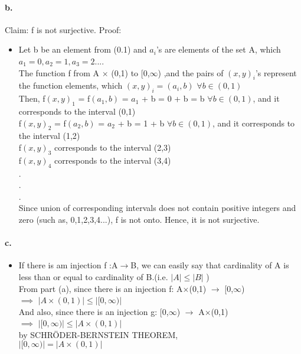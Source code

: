 \documentclass[11pt]{article}
\begin{document}
\paragraph{b.}
Claim: f is not surjective. \newline
Proof:
\begin{itemize}
    \item Let b be an element from (0.1) and $a_i$'s are elements of the set A, which $a_1 = 0, a_2 = 1, a_3 = 2 ...$.\\
    The function f from A $\times$ (0,1) to [0,$\infty$) ,and the pairs of $(x,y)_i$'s represent the function elements, which $(x,y)_i = (a_i,b)$ $ \forall b \in (0,1)$ \\
    Then, f$(x,y)_1$ = f$(a_1,b)$ = $a_1$ + b = 0 + b = b $\forall b \in (0,1)$, and it corresponds to the interval (0,1) \\
    f$(x,y)_2$ = f$(a_2,b)$ = $a_2$ + b = 1 + b $\forall b \in (0,1)$, and it corresponds to the interval (1,2) \\
    f$(x,y)_3$ corresponds to the interval (2,3) \\
    f$(x,y)_4$ corresponds to the interval (3,4) \\
    .\\
    .\\
    .\\
    Since union of corresponding intervals does not contain positive integers and zero (such as, 0,1,2,3,4...), f is not onto. Hence, it is not surjective.  
\end{itemize}
\paragraph{c.}
\begin{itemize}
    \item If there is am injection f :A$\rightarrow$B, we can easily say that cardinality of A is less than or equal to cardinality of B.(i.e. $|A| \leq |B|$ ) \\
    From part (a), since there is an injection f: A$\times$(0,1) $\rightarrow$ [0,$\infty$) \\
    $\implies$ $|A\times(0,1)| \leq |[0,\infty)|$ \\
    And also, since there is an injection g: [0,$\infty$) $\rightarrow$ A$\times$(0,1) \\
    $\implies$ $|[0,\infty)| \leq |A\times(0,1)|$ \\
    by SCHRÖDER-BERNSTEIN THEOREM, \\
    $|[0,\infty)| = |A\times(0,1)|$
\end{itemize}
\end{document}
